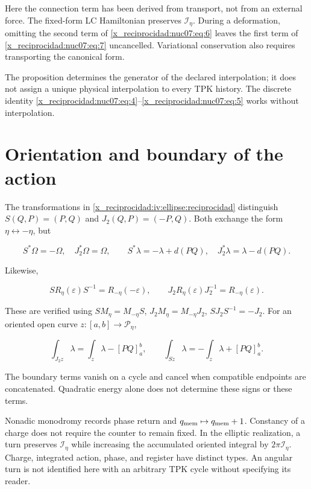 Here the connection term has been derived from transport, not from an external force. The fixed-form LC Hamiltonian preserves \(\mathcal I_\eta\). During a deformation, omitting the second term of \eqref{x_reciprocidad:nuc07:eq:6} leaves the first term of \eqref{x_reciprocidad:nuc07:eq:7} uncancelled. Variational conservation also requires transporting the canonical form.

The proposition determines the generator of the declared interpolation; it does not assign a unique physical interpolation to every TPK history. The discrete identity \eqref{x_reciprocidad:nuc07:eq:4}–\eqref{x_reciprocidad:nuc07:eq:5} works without interpolation.

\section{Orientation and boundary of the action}

The transformations in \cref{x_reciprocidad:iv:ellipse:reciprocidad} distinguish \(S(Q,P)=(P,Q)\) and \(J_2(Q,P)=(-P,Q)\). Both exchange the form \(\eta\leftrightarrow-\eta\), but

\begin{equation}
S^*\Omega=-\Omega,\quad J_2^*\Omega=\Omega,\qquad
S^*\lambda=-\lambda+d(PQ),\quad
J_2^*\lambda=\lambda-d(PQ).
\label{x_reciprocidad:nuc07:eq:9}
\end{equation}

Likewise,

\begin{equation}
S R_\eta(\varepsilon)S^{-1}=R_{-\eta}(-\varepsilon),\qquad
J_2R_\eta(\varepsilon)J_2^{-1}=R_{-\eta}(\varepsilon).
\label{x_reciprocidad:nuc07:eq:10}
\end{equation}

These are verified using \(SM_\eta=M_{-\eta}S\), \(J_2M_\eta=M_{-\eta}J_2\), \(SJ_2S^{-1}=-J_2\). For an oriented open curve \(z:[a,b]\to\mathcal P_\eta\),

\begin{equation}
\int_{J_2z}\lambda=\int_z\lambda-[PQ]_a^b,\qquad
\int_{Sz}\lambda=-\int_z\lambda+[PQ]_a^b.
\label{x_reciprocidad:nuc07:eq:11}
\end{equation}

The boundary terms vanish on a cycle and cancel when compatible endpoints are concatenated. Quadratic energy alone does not determine these signs or these terms.

Nonadic monodromy records phase return and \(q_{\rm mem}\mapsto q_{\rm mem}+1\). Constancy of a charge does not require the counter to remain fixed. In the elliptic realization, a turn preserves \(\mathcal I_\eta\) while increasing the accumulated oriented integral by \(2\pi\mathcal I_\eta\). Charge, integrated action, phase, and register have distinct types. An angular turn is not identified here with an arbitrary TPK cycle without specifying its reader.

